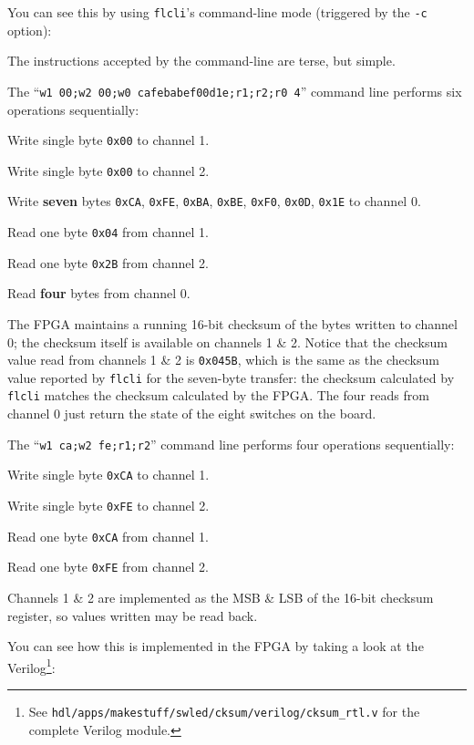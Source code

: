 You can see this by using \texttt{flcli}'s command-line mode (triggered by the \texttt{-c} option):


The instructions accepted by the command-line are terse, but simple.

The ``\texttt{w1 00;w2 00;w0 cafebabef00d1e;r1;r2;r0 4}'' command line performs six operations sequentially:

\begin{blobs}
  \item Write single byte \texttt{0x00} to channel 1.
  \item Write single byte \texttt{0x00} to channel 2.
  \item Write \textbf{seven} bytes \texttt{0xCA}, \texttt{0xFE}, \texttt{0xBA}, \texttt{0xBE}, \texttt{0xF0}, \texttt{0x0D}, \texttt{0x1E} to channel 0.
  \item Read one byte \texttt{0x04} from channel 1.
  \item Read one byte \texttt{0x2B} from channel 2.
  \item Read \textbf{four} bytes from channel 0.
\end{blobs}

The FPGA maintains a running 16-bit checksum of the bytes written to channel 0; the checksum itself is available on channels 1 \& 2. Notice that the checksum value read from channels 1 \& 2 is \texttt{0x045B}, which is the same as the checksum value reported by \texttt{flcli} for the seven-byte transfer: the checksum calculated by \texttt{flcli} matches the checksum calculated by the FPGA. The four reads from channel 0 just return the state of the eight switches on the board.

The ``\texttt{w1 ca;w2 fe;r1;r2}'' command line performs four operations sequentially:

\begin{blobs}
  \item Write single byte \texttt{0xCA} to channel 1.
  \item Write single byte \texttt{0xFE} to channel 2.
  \item Read one byte \texttt{0xCA} from channel 1.
  \item Read one byte \texttt{0xFE} from channel 2.
\end{blobs}

Channels 1 \& 2 are implemented as the MSB \& LSB of the 16-bit checksum register, so values written may be read back.

You can see how this is implemented in the FPGA by taking a look at the Verilog\footnote{See \texttt{hdl/apps/makestuff/swled/cksum/verilog/cksum\_rtl.v} for the complete Verilog module.}:

